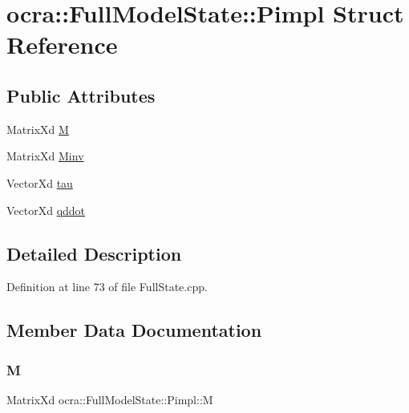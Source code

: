 \hypertarget{structocra_1_1FullModelState_1_1Pimpl}{}\section{ocra\+:\+:Full\+Model\+State\+:\+:Pimpl Struct Reference}
\label{structocra_1_1FullModelState_1_1Pimpl}
\subsection*{Public Attributes}
\begin{DoxyCompactItemize}
\item 
Matrix\+Xd \hyperlink{structocra_1_1FullModelState_1_1Pimpl_a0482896483cb287cfc1066df1326f250}{M}
\item 
Matrix\+Xd \hyperlink{structocra_1_1FullModelState_1_1Pimpl_a66abf4494ddc5e7de0fbdeee4d6404d0}{Minv}
\item 
Vector\+Xd \hyperlink{structocra_1_1FullModelState_1_1Pimpl_a451de435a3d80fdc760ab0d37cbad664}{tau}
\item 
Vector\+Xd \hyperlink{structocra_1_1FullModelState_1_1Pimpl_a9575456409af57d39f990f2dda27c23f}{qddot}
\end{DoxyCompactItemize}


\subsection{Detailed Description}


Definition at line 73 of file Full\+State.\+cpp.



\subsection{Member Data Documentation}
\hypertarget{structocra_1_1FullModelState_1_1Pimpl_a0482896483cb287cfc1066df1326f250}{}\label{structocra_1_1FullModelState_1_1Pimpl_a0482896483cb287cfc1066df1326f250} 
\subsubsection{\texorpdfstring{M}{M}}
{\footnotesize\ttfamily Matrix\+Xd ocra\+::\+Full\+Model\+State\+::\+Pimpl\+::M}



